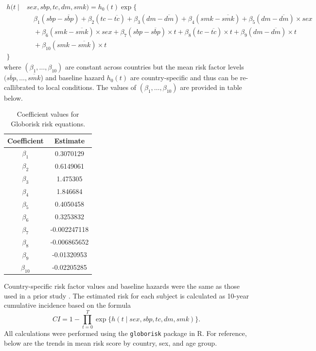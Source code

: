 \documentclass[12pt]{article}
\begin{document}
\begin{appendix}
    \begin{align*}
        h(t \mid& sex, sbp, tc, dm, smk) = h_0(t) \exp\big\{ \\
        &\quad \beta_1 (sbp - \overline{sbp}) + \beta_2 (tc - \overline{tc}) + \beta_3 (dm - \overline{dm}) + \beta_4 (smk - \overline{smk}) + \beta_5 (dm - \overline{dm}) \times sex
        \\ &\quad + \beta_6 (smk - \overline{smk}) \times sex + \beta_7 (sbp - \overline{sbp}) \times t + \beta_8 (tc - \overline{tc}) \times t + \beta_9 (dm - \overline{dm}) \times t
        \\ &\quad  + \beta_{10} (smk - \overline{smk}) \times t \\
        \big\}
    \end{align*}
    where $(\beta_1, \ldots, \beta_{10})$ are constant across countries but the mean risk factor levels $(\overline{sbp}, \ldots, \overline{smk}$) and baseline hazard $h_0(t)$ are country-specific and thus can be re-callibrated to local conditions. The values of $(\beta_1, \ldots, \beta_{10})$ are provided in table below.
    \begin{table}[H]
        \centering
        \caption{Coefficient values for Globorisk risk equations.}
        \label{tab:coefs}
        \begin{tabular}[t]{cc}
            \toprule
            Coefficient & Estimate  \\
            \midrule
            $\beta_1$ & 0.3070129 \\
            $\beta_2$ & 0.6149061 \\
            $\beta_3$ & 1.475305 \\
            $\beta_4$ & 1.846684 \\
            $\beta_5$ & 0.4050458 \\
            $\beta_6$ & 0.3253832 \\
            $\beta_7$ & -0.002247118 \\
            $\beta_8$ & -0.006865652 \\
            $\beta_9$ & -0.01320953 \\
            $\beta_{10}$ & -0.02205285 \\
            \bottomrule
            \end{tabular}
    \end{table}
    Country-specific risk factor values and baseline hazards were the same as those used in a prior study \cite{ueda_laboratory-based_2017}. The estimated risk for each subject is calculated as 10-year cumulative incidence based on the formula
    \begin{equation*}
        CI = 1 - \prod_{t=0}^T\exp\{h(t \mid sex, sbp, tc, dm, smk)\}.
    \end{equation*}
    All calculations were performed using the \texttt{globorisk} package \cite{boyer_globorisk_2022} in R. For reference, below are the trends in mean risk score by country, sex, and age group. 


\end{appendix}
\end{document}

